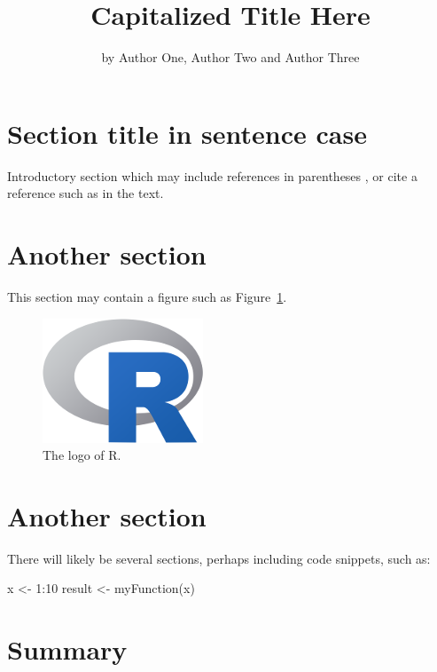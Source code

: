 \title{Capitalized Title Here}
\author{by Author One, Author Two and Author Three}

\maketitle


\section{Section title in sentence case}

Introductory section which may include references in parentheses
\citep{R}, or cite a reference such as \citet{R} in the text.

\section{Another section}

This section may contain a figure such as Figure~\ref{figure:rlogo}.

\begin{figure}[htbp]
  \centering
  \includegraphics{Rlogo-5}
  \caption{The logo of R.}
  \label{figure:rlogo}
\end{figure}

\section{Another section}

There will likely be several sections, perhaps including code snippets, such as:

\begin{example}
  x <- 1:10
  result <- myFunction(x)
\end{example}

\section{Summary}

